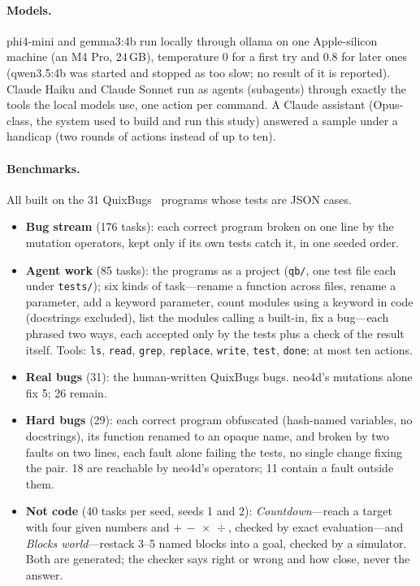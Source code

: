 \documentclass[10pt]{article}
\begin{document}
\paragraph{Models.} phi4-mini and gemma3:4b run locally through ollama on one Apple-silicon machine (an M4 Pro, 24\,GB),
temperature 0 for a first try and 0.8 for later ones (qwen3.5:4b was started and stopped as too slow; no result of it
is reported). Claude Haiku and Claude Sonnet run as agents (subagents) through
exactly the tools the local models use, one action per command. A Claude assistant (Opus-class, the system used to
build and run this study) answered a sample under a handicap (two rounds of actions instead of up to ten).

\paragraph{Benchmarks.} All built on the 31 QuixBugs~\cite{quixbugs} programs whose tests are JSON cases.
\begin{itemize}
  \item \textbf{Bug stream} (176 tasks): each correct program broken on one line by the mutation operators, kept only if
  its own tests catch it, in one seeded order.
  \item \textbf{Agent work} (85 tasks): the programs as a project (\texttt{qb/}, one test file each under
  \texttt{tests/}); six kinds of task---rename a function across files, rename a parameter, add a keyword parameter,
  count modules using a keyword in code (docstrings excluded), list the modules calling a built-in, fix a bug---each
  phrased two ways, each accepted only by the tests plus a check of the result itself. Tools: \texttt{ls},
  \texttt{read}, \texttt{grep}, \texttt{replace}, \texttt{write}, \texttt{test}, \texttt{done}; at most ten actions.
  \item \textbf{Real bugs} (31): the human-written QuixBugs bugs. neo4d's mutations alone fix 5; 26 remain.
  \item \textbf{Hard bugs} (29): each correct program obfuscated (hash-named variables, no docstrings), its function
  renamed to an opaque name, and broken by two faults on two lines, each fault alone failing the tests, no single
  change fixing the pair. 18 are reachable by neo4d's operators; 11 contain a fault outside them.
  \item \textbf{Not code} (40 tasks per seed, seeds 1 and 2): \emph{Countdown}---reach a target with four given numbers
  and $+\,-\,\times\,\div$, checked by exact evaluation---and \emph{Blocks world}---restack 3--5 named blocks into a goal,
  checked by a simulator. Both are generated; the checker says right or wrong and how close, never the answer.
\end{itemize}
\end{document}
